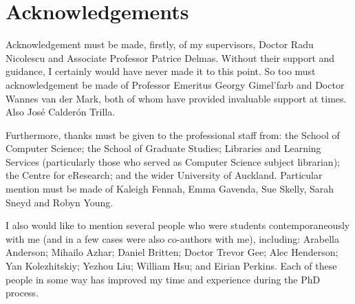 

\chapter*{Acknowledgements}

Acknowledgement must be made, firstly, of my supervisors, Doctor Radu Nicolescu and Associate Professor Patrice Delmas.  Without their support and guidance, I certainly would have never made it to this point.  So too must acknowledgement be made of Professor Emeritus Georgy Gimel'farb and Doctor Wannes van der Mark, both of whom have provided invaluable support at times.    Also José Calderón Trilla.

Furthermore, thanks must be given to the professional staff from: the School of Computer Science; the School of Graduate Studies; Libraries and Learning Services (particularly those who served as Computer Science subject librarian); the Centre for eResearch; and the wider University of Auckland.  Particular mention must be made of Kaleigh Fennah, Emma Gavenda, Sue Skelly, Sarah Sneyd and Robyn Young.

I also would like to mention several people who were students contemporaneously with me (and in a few cases were also co-authors with me), including: Arabella Anderson; Mihailo Azhar; Daniel Britten; Doctor Trevor Gee; Alec Henderson; Yan Kolezhitskiy; Yezhou Liu; William Hsu; and Eirian Perkins.  Each of these people in some way has improved my time and experience during the PhD process.

